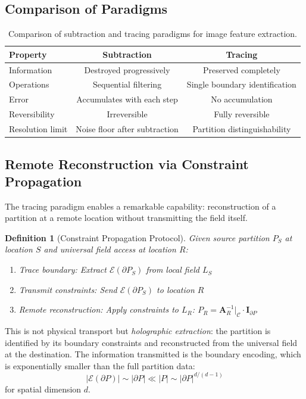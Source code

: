 \documentclass[twocolumn,10pt,a4paper]{article}
\newtheorem{definition}[theorem]{Definition}
\begin{document}
\subsection{Comparison of Paradigms}

\begin{table}[h]
\centering
\begin{tabular}{lcc}
\toprule
\textbf{Property} & \textbf{Subtraction} & \textbf{Tracing} \\
\midrule
Information & Destroyed progressively & Preserved completely \\
Operations & Sequential filtering & Single boundary identification \\
Error & Accumulates with each step & No accumulation \\
Reversibility & Irreversible & Fully reversible \\
Resolution limit & Noise floor after subtraction & Partition distinguishability \\
\bottomrule
\end{tabular}
\caption{Comparison of subtraction and tracing paradigms for image feature extraction.}
\end{table}

\subsection{Remote Reconstruction via Constraint Propagation}

The tracing paradigm enables a remarkable capability: reconstruction of a partition at a remote location without transmitting the field itself.

\begin{definition}[Constraint Propagation Protocol]
Given source partition $P_S$ at location $S$ and universal field access at location $R$:
\begin{enumerate}
    \item Trace boundary: Extract $\mathcal{E}(\partial P_S)$ from local field $L_S$
    \item Transmit constraints: Send $\mathcal{E}(\partial P_S)$ to location $R$
    \item Remote reconstruction: Apply constraints to $L_R$: $P_R = \mathbf{A}_R^{-1}|_{\mathcal{C}} \cdot \mathbf{I}_{\partial P}$
\end{enumerate}
\end{definition}

This is not physical transport but \emph{holographic extraction}: the partition is identified by its boundary constraints and reconstructed from the universal field at the destination. The information transmitted is the boundary encoding, which is exponentially smaller than the full partition data:
\begin{equation}
|\mathcal{E}(\partial P)| \sim |\partial P| \ll |P| \sim |\partial P|^{d/(d-1)}
\end{equation}
for spatial dimension $d$.
\end{document}
